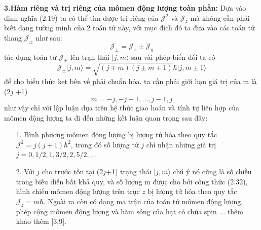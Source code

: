   \textbf{3.Hàm riêng và trị riêng của mômen động lượng toàn phần:} Dựa vào định nghĩa (2.19)  ta có thể tìm được trị riêng của $\mathcal{J}^2$ và $\mathcal{J}_z$  mà không cần phải biết dạng tường minh của 2 toán tử này, với mục đích đó ta đưa vào các toán tử thang $\mathcal{J}_{\pm}$ như sau:
  \begin{equation}
  \mathcal{J}_{\pm} =\mathcal{J}_x \pm \mathcal{J}_y 
  \end{equation}
  tác dụng toán tử $\mathcal{J}_{\pm}$ lên trạn thái $\vert j,m\rangle$ sau vài phép biến đổi ta có
  \begin{equation}
  \mathcal{J}_{\pm}\vert j,m\rangle = \sqrt{(j\mp m)(j\pm m+1)}\hbar\vert j,m\pm 1\rangle
  \end{equation}
  để cho biểu thức ket bên vế phải chuẩn hóa. ta cần phải giới hạn giá trị của m là (2$j$ +1)
  \begin{equation}
   m= -j,-j+1,\dots ,j-1,j
  \end{equation} 
  như vậy chỉ với lập luận dựa trên hệ thức giao hoán  và tính tự liên hợp của mômen động lượng ta đi đến những kết luận quan trọng sau đây:
  \begin{enumerate}
  \item[1.] Bình phương mômen động lượng bị lượng tử hóa theo quy tắc  $\mathcal{J}^2 = j(j+1)\hbar^2$, trong đó số lượng tử $j$ chỉ nhận những giá trị $j=0,1/2,1,3/2,2,5/2,\dots$
  \item[2.] Với $j$ cho trước tồn tại (2$j$+1) trạng thái $\vert j,m\rangle$ chú ý nó cũng là số chiều trong biễu diễn bất khả quy, và số lượng m được cho bởi công thức (2.32), hình chiếu mômen động lượng trên trục $z$ bị lượng tử hóa theo quy tắc $\mathcal{J}_z=m\hbar$. Ngoài ra còn có dạng ma trận của toán tử mômen động lượng, phép cộng mômen động lượng và hàm sóng của hạt có chứa spin $\dots$ thêm khảo thêm [3,9].
  \end{enumerate}

